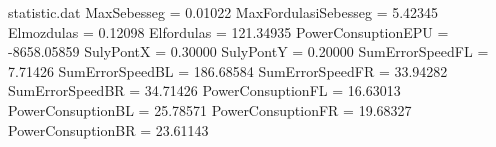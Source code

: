 \begin{filecontents*}{statistic.dat}
MaxSebesseg =    0.01022
MaxFordulasiSebesseg =    5.42345
Elmozdulas =    0.12098
Elfordulas =  121.34935
PowerConsuptionEPU = -8658.05859
SulyPontX =    0.30000
SulyPontY =    0.20000
SumErrorSpeedFL =   7.71426
SumErrorSpeedBL = 186.68584
SumErrorSpeedFR =  33.94282
SumErrorSpeedBR =  34.71426
PowerConsuptionFL =   16.63013
PowerConsuptionBL =   25.78571
PowerConsuptionFR =  19.68327
PowerConsuptionBR =  23.61143
\end{filecontents*}
